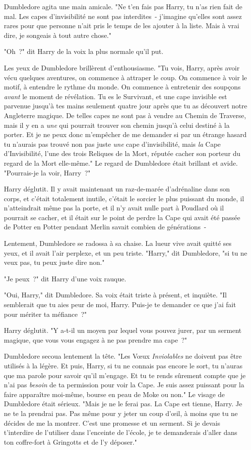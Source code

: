 Dumbledore agita une main amicale. "Ne t'en fais pas Harry, tu n'as rien fait de mal. Les capes d'invisibilité ne sont pas interdites~- j'imagine qu'elles sont assez rares pour que personne n'ait pris le temps de les ajouter à la liste. Mais à vrai dire, je songeais à tout autre chose."

"Oh~?" dit Harry de la voix la plus normale qu'il put.

Les yeux de Dumbledore brillèrent d'enthousiasme. "Tu vois, Harry, après avoir vécu quelques aventures, on commence à attraper le coup. On commence à voir le motif, à entendre le rythme du monde. On commence à entretenir des soupçons \emph{avant} le moment de révélation. Tu es le Survivant, et une cape invisible est parvenue jusqu'à tes mains seulement quatre jour après que tu as découvert notre Angleterre magique. De telles capes ne sont pas à vendre au Chemin de Traverse, mais il y en a \emph{une} qui pourrait trouver son chemin jusqu'à celui destiné à la porter. Et je ne peux donc m'empêcher de me demander si par un étrange hasard tu n'aurais pas trouvé non pas juste \emph{une} cape d'invisibilité, mais \emph{la} Cape d'Invisibilité, l'une des trois Reliques de la Mort, réputée cacher son porteur du regard de la Mort elle-même." Le regard de Dumbledore était brillant et avide. "Pourrais-je la voir, Harry~?"

Harry déglutit. Il y avait maintenant un raz-de-marée d'adrénaline dans son corps, et c'était totalement inutile, c'était le sorcier le plus puissant du monde, il n'atteindrait même pas la porte, et il n'y avait nulle part à Poudlard où il pourrait se cacher, et il était sur le point de perdre la Cape qui avait été passée de Potter en Potter pendant Merlin savait combien de générations~-

Lentement, Dumbledore se radossa à sa chaise. La lueur vive avait quitté ses yeux, et il avait l'air perplexe, et un peu triste. "Harry," dit Dumbledore, "si tu ne veux pas, tu peux juste dire non."

"Je peux~?" dit Harry d'une voix rauque.

"Oui, Harry," dit Dumbledore. Sa voix était triste à présent, et inquiète. "Il semblerait que tu aies peur de moi, Harry. Puis-je te demander ce que j'ai fait pour mériter ta méfiance~?"

Harry déglutit. "Y a-t-il un moyen par lequel vous pouvez jurer, par un serment magique, que vous vous engagez à ne pas prendre ma cape~?"

Dumbledore secoua lentement la tête. "Les Vœux \emph{Inviolables} ne doivent pas être utilisés à la légère. Et puis, Harry, si tu ne connais pas encore le sort, tu n'auras que ma parole pour savoir qu'il m'engage. Et tu te rends sûrement compte que je n'ai pas \emph{besoin} de ta permission pour voir la Cape. Je suis assez puissant pour la faire apparaître moi-même, bourse en peau de Moke ou non." Le visage de Dumbledore était sérieux. "Mais je ne le ferai pas. La Cape est tienne, Harry. Je ne te la prendrai pas. Pas même pour y jeter un coup d'œil, à moins que tu ne décides de me la montrer. C'est une promesse et un serment. Si je devais t'interdire de l'utiliser dans l'enceinte de l'école, je te demanderais d'aller dans ton coffre-fort à Gringotts et de l'y déposer."

